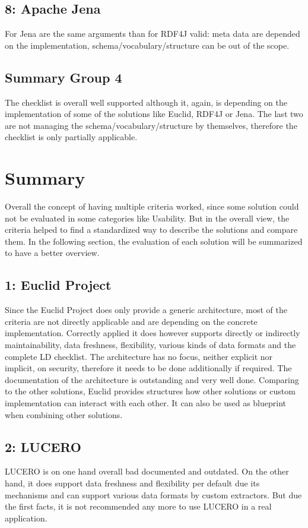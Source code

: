 \subsection*{8: Apache Jena}
For Jena are the same arguments than for RDF4J valid: meta data are depended on 
the implementation, schema/vocabulary/structure can be out of the scope.

\subsection{Summary Group 4}
The checklist is overall well supported although it, again, is depending on the 
implementation of some of the solutions like Euclid, RDF4J or Jena. The last two 
are not managing the schema/vocabulary/structure by themselves, therefore the 
checklist is only partially applicable.

\section{Summary}\label{comp_summary}

Overall the concept of having multiple criteria worked, since some solution could 
not be evaluated in some categories like Usability. But in the overall view, the 
criteria helped to find a standardized way to describe the solutions and compare 
them. In the following section, the evaluation of each solution will be summarized 
to have a better overview.

\subsection*{1: Euclid Project}
Since the Euclid Project does only provide a generic architecture, most of the 
criteria are not directly applicable and are depending on the concrete 
implementation. Correctly applied it does however supports directly or indirectly 
maintainability, data freshness, flexibility, various kinds of data formats and 
the complete LD checklist. The architecture has no focus, neither explicit nor 
implicit, on security, therefore it needs to be done additionally if required. The 
documentation of the architecture is outstanding and very well done.
Comparing to the other solutions, Euclid provides structures how other solutions 
or custom implementation can interact with each other. It can also be used as 
blueprint when combining other solutions.

\subsection*{2: LUCERO}
LUCERO is on one hand overall bad documented and outdated. On the other hand, it 
does support data freshness and flexibility per default due its mechanisms and can 
support various data formats by custom extractors. But due the first facts, it is 
not recommended any more to use LUCERO in a real application.

